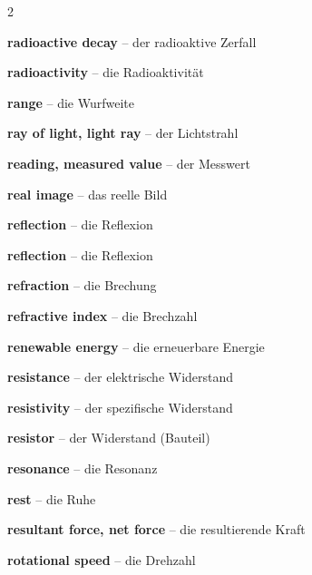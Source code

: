 \begin{multicols}{2}
\par\nopagebreak
\textbf{radioactive decay} -- der radioaktive Zerfall\dotfill\hyperref[e:274]{\pageref*{e:274}}\par
\textbf{radioactivity} -- die Radioaktivität\dotfill\hyperref[e:273]{\pageref*{e:273}}\par
\textbf{range} -- die Wurfweite\dotfill\hyperref[e:49]{\pageref*{e:49}}\par
\textbf{ray of light, light ray} -- der Lichtstrahl\dotfill\hyperref[e:222]{\pageref*{e:222}}\par
\textbf{reading, measured value} -- der Messwert\dotfill\hyperref[e:10]{\pageref*{e:10}}\par
\textbf{real image} -- das reelle Bild\dotfill\hyperref[e:250]{\pageref*{e:250}}\par
\textbf{reflection} -- die Reflexion\dotfill\hyperref[e:207]{\pageref*{e:207}}\par
\textbf{reflection} -- die Reflexion\dotfill\hyperref[e:227]{\pageref*{e:227}}\par
\textbf{refraction} -- die Brechung\dotfill\hyperref[e:234]{\pageref*{e:234}}\par
\textbf{refractive index} -- die Brechzahl\dotfill\hyperref[e:236]{\pageref*{e:236}}\par
\textbf{renewable energy} -- die erneuerbare Energie\dotfill\hyperref[e:110]{\pageref*{e:110}}\par
\textbf{resistance} -- der elektrische Widerstand\dotfill\hyperref[e:146]{\pageref*{e:146}}\par
\textbf{resistivity} -- der spezifische Widerstand\dotfill\hyperref[e:148]{\pageref*{e:148}}\par
\textbf{resistor} -- der Widerstand (Bauteil)\dotfill\hyperref[e:159]{\pageref*{e:159}}\par
\textbf{resonance} -- die Resonanz\dotfill\hyperref[e:200]{\pageref*{e:200}}\par
\textbf{rest} -- die Ruhe\dotfill\hyperref[e:31]{\pageref*{e:31}}\par
\textbf{resultant force, net force} -- die resultierende Kraft\dotfill\hyperref[e:74]{\pageref*{e:74}}\par
\textbf{rotational speed} -- die Drehzahl\dotfill\hyperref[e:53]{\pageref*{e:53}}\par


\end{multicols}
